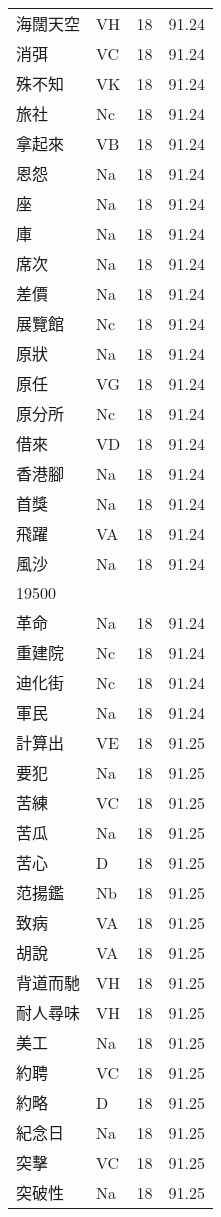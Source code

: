 \documentclass[twocolumn]{book}
\begin{document}
\begin{supertabular}{llrr}
海闊天空 & VH & 18 &  91.24\\
消弭 & VC & 18 &  91.24\\
殊不知 & VK & 18 &  91.24\\
旅社 & Nc & 18 &  91.24\\
拿起來 & VB & 18 &  91.24\\
恩怨 & Na & 18 &  91.24\\
座 & Na & 18 &  91.24\\
庫 & Na & 18 &  91.24\\
席次 & Na & 18 &  91.24\\
差價 & Na & 18 &  91.24\\
展覽館 & Nc & 18 &  91.24\\
原狀 & Na & 18 &  91.24\\
原任 & VG & 18 &  91.24\\
原分所 & Nc & 18 &  91.24\\
借來 & VD & 18 &  91.24\\
香港腳 & Na & 18 &  91.24\\
首獎 & Na & 18 &  91.24\\
飛躍 & VA & 18 &  91.24\\
風沙 & Na & 18 &  91.24\\
19500\\
革命 & Na & 18 &  91.24\\
重建院 & Nc & 18 &  91.24\\
迪化街 & Nc & 18 &  91.24\\
軍民 & Na & 18 &  91.24\\
計算出 & VE & 18 &  91.25\\
要犯 & Na & 18 &  91.25\\
苦練 & VC & 18 &  91.25\\
苦瓜 & Na & 18 &  91.25\\
苦心 & D & 18 &  91.25\\
范揚鑑 & Nb & 18 &  91.25\\
致病 & VA & 18 &  91.25\\
胡說 & VA & 18 &  91.25\\
背道而馳 & VH & 18 &  91.25\\
耐人尋味 & VH & 18 &  91.25\\
美工 & Na & 18 &  91.25\\
約聘 & VC & 18 &  91.25\\
約略 & D & 18 &  91.25\\
紀念日 & Na & 18 &  91.25\\
突擊 & VC & 18 &  91.25\\
突破性 & Na & 18 &  91.25\\

\end{supertabular}
\end{document}
